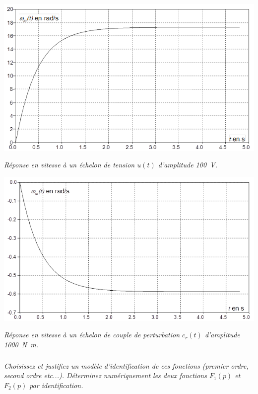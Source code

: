 \documentclass[10pt,fleqn]{article} %
\begin{document}
\noindent\begin{minipage}[c]{.48\linewidth}
\begin{center}
\includegraphics[width=\linewidth]{images2/fig_06_a}

\textit{Réponse en vitesse à un échelon de tension $u(t)$ d’amplitude \SI{100}{V}.}
\end{center}

\end{minipage}\hfill
\begin{minipage}[c]{.48\linewidth}
\begin{center}
\includegraphics[width=\linewidth]{images2/fig_06_b}

\textit{Réponse en vitesse à un échelon de couple de perturbation $c_r(t)$ d’amplitude \SI{1000}{N.m}.}
\end{center}
\end{minipage}



\subparagraph{}
\textit{Choisissez et justifiez un modèle d’identification de ces fonctions (premier ordre, second ordre etc...). Déterminez numériquement les deux fonctions $F_1(p)$ et $F_2(p)$ par identification.}
\end{document}

